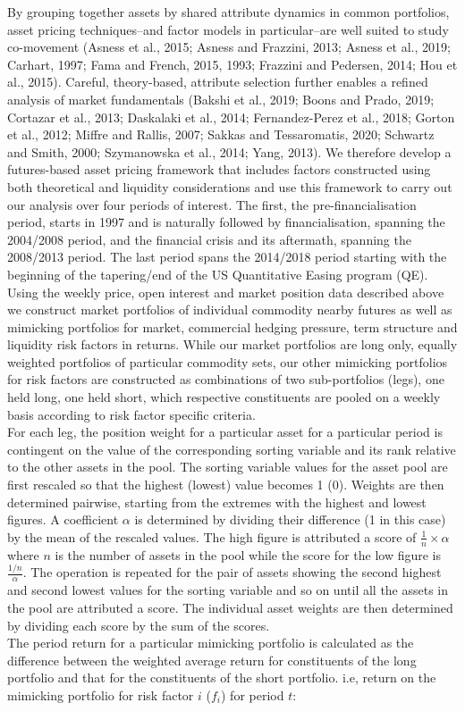 \documentclass[]{elsarticle} %
\begin{document}
By grouping together assets by shared attribute dynamics in common portfolios, asset pricing techniques--and factor models in particular--are well suited to study co-movement (Asness et al., 2015; Asness and Frazzini, 2013; Asness et al., 2019; Carhart, 1997; Fama and French, 2015, 1993; Frazzini and Pedersen, 2014; Hou et al., 2015). Careful, theory-based, attribute selection further enables a refined analysis of market fundamentals (Bakshi et al., 2019; Boons and Prado, 2019; Cortazar et al., 2013; Daskalaki et al., 2014; Fernandez-Perez et al., 2018; Gorton et al., 2012; Miffre and Rallis, 2007; Sakkas and Tessaromatis, 2020; Schwartz and Smith, 2000; Szymanowska et al., 2014; Yang, 2013). We therefore develop a futures-based asset pricing framework that includes factors constructed using both theoretical and liquidity considerations and use this framework to carry out our analysis over four periods of interest. The first, the pre-financialisation period, starts in 1997 and is naturally followed by financialisation, spanning the 2004/2008 period, and the financial crisis and its aftermath, spanning the 2008/2013 period. The last period spans the 2014/2018 period starting with the beginning of the tapering/end of the US Quantitative Easing program (QE).\\
Using the weekly price, open interest and market position data described above we construct market portfolios of individual commodity nearby futures as well as mimicking portfolios for market, commercial hedging pressure, term structure and liquidity risk factors in returns. While our market portfolios are long only, equally weighted portfolios of particular commodity sets, our other mimicking portfolios for risk factors are constructed as combinations of two sub-portfolios (legs), one held long, one held short, which respective constituents are pooled on a weekly basis according to risk factor specific criteria.\\
For each leg, the position weight for a particular asset for a particular period is contingent on the value of the corresponding sorting variable and its rank relative to the other assets in the pool. The sorting variable values for the asset pool are first rescaled so that the highest (lowest) value becomes 1 (0). Weights are then determined pairwise, starting from the extremes with the highest and lowest figures. A coefficient \(\alpha\) is determined by dividing their difference (1 in this case) by the mean of the rescaled values. The high figure is attributed a score of \(\frac{1}{n} \times \alpha\) where \(n\) is the number of assets in the pool while the score for the low figure is \(\frac{1/n}{\alpha}\). The operation is repeated for the pair of assets showing the second highest and second lowest values for the sorting variable and so on until all the assets in the pool are attributed a score. The individual asset weights are then determined by dividing each score by the sum of the scores.\\
The period return for a particular mimicking portfolio is calculated as the difference between the weighted average return for constituents of the long portfolio and that for the constituents of the short portfolio. i.e, return on the mimicking portfolio for risk factor \(i\) (\(f_{i}\)) for period \(t\):
\end{document}
